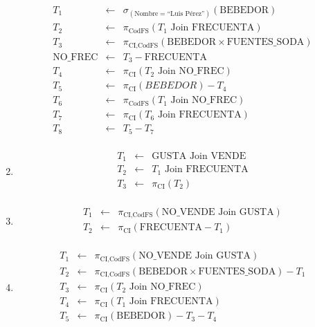 \documentclass[12pt]{article}
\newcommand{\asig}{\ensuremath{\leftarrow}}
\begin{document}
\begin{enumerate}
\begin{eqnarray*}
 T_1 & \asig & \sigma_{(\text{Nombre}=\text{``Luis Pérez''})}(\text{BEBEDOR}) \\
 T_2 & \asig & \pi_{\text{CodFS}}(T_1 \text{ Join } \text{FRECUENTA}) \\ %
 T_3 & \asig & \pi_{\text{CI,CodFS}}(\text{BEBEDOR} \times \text{FUENTES\_SODA}) \\
 \text{NO\_FREC} & \asig & T_3 - \text{FRECUENTA} \\ %
 T_4 & \asig & \pi_{\text{CI}}(T_2 \text{ Join } \text{NO\_FREC}) \\ %
 T_5 & \asig & \pi_{\text{CI}}(BEBEDOR) - T_4 \\
 T_6 & \asig & \pi_{\text{CodFS}}(T_1 \text{ Join } \text{NO\_FREC}) \\ %
 T_7 & \asig & \pi_{\text{CI}}(T_6 \text{ Join } \text{FRECUENTA}) \\ %
 T_8 & \asig & T_5 - T_7 \\
\end{eqnarray*}

 \item 

\begin{eqnarray*}
 T_1 & \asig & \text{GUSTA} \text{ Join } \text{VENDE} \\
 T_2 & \asig & T_1 \text{ Join } \text{FRECUENTA} \\
 T_3 & \asig & \pi_{\text{CI}}(T_2) \\
\end{eqnarray*}

 \item 

\begin{eqnarray*}
 T_1 & \asig & \pi_{\text{CI,CodFS}}(\text{NO\_VENDE} \text{ Join } \text{GUSTA}) \\
 T_2 & \asig & \pi_{\text{CI}}(\text{FRECUENTA}-T_1) \\
\end{eqnarray*}

 \item 

\begin{eqnarray*}
 T_1 & \asig & \pi_{\text{CI,CodFS}}(\text{NO\_VENDE} \text{ Join } \text{GUSTA}) \\
 T_2 & \asig & \pi_{\text{CI,CodFS}}(\text{BEBEDOR} \times \text{FUENTES\_SODA}) - T_1 \\
 T_3 & \asig & \pi_{\text{CI}}(T_2 \text{ Join } \text{NO\_FREC}) \\
 T_4 & \asig & \pi_{\text{CI}}(T_1 \text{ Join } \text{FRECUENTA}) \\
 T_5 & \asig & \pi_{\text{CI}}(\text{BEBEDOR}) - T_3 - T_4 \\
\end{eqnarray*}


\end{enumerate}
\end{document}
